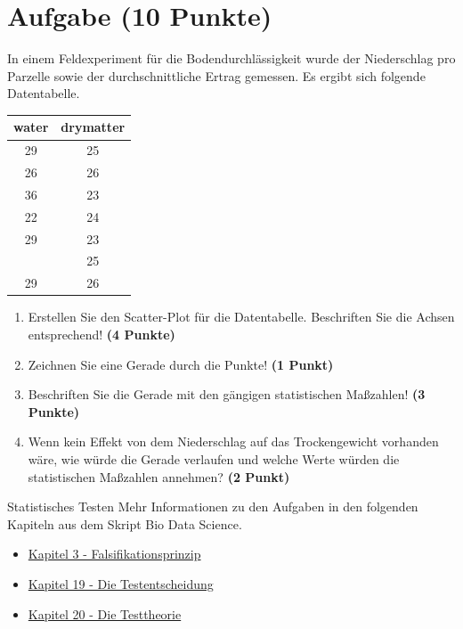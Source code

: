 \documentclass[a4paper, 10pt]{scrartcl}\usepackage[]{graphicx}\usepackage[]{xcolor}
\begin{document}
\section{Aufgabe \hfill (10 Punkte)}

In einem Feldexperiment f{\"u}r die Bodendurchl{\"a}ssigkeit wurde der Niederschlag
pro Parzelle sowie der durchschnittliche Ertrag gemessen. Es ergibt sich
folgende Datentabelle. 

\begin{table}[!h]
\centering
\begin{tabular}{cc}
\toprule
water & drymatter\\
\midrule
29 & 25\\
26 & 26\\
36 & 23\\
22 & 24\\
29 & 23\\
\addlinespace
24 & 25\\
29 & 26\\
\bottomrule
\end{tabular}
\end{table}



\begin{enumerate}
\item Erstellen Sie den Scatter-Plot f{\"u}r die Datentabelle. Beschriften Sie
  die Achsen entsprechend! \textbf{(4 Punkte)}
\item Zeichnen Sie eine Gerade durch die Punkte! \textbf{(1 Punkt)}
\item Beschriften Sie die Gerade mit den g{\"a}ngigen statistischen Ma{\ss}zahlen! \textbf{(3 Punkte)}
\item Wenn kein Effekt von dem Niederschlag auf das Trockengewicht
  vorhanden w{\"a}re, wie w{\"u}rde die Gerade verlaufen und welche Werte w{\"u}rden die
  statistischen Ma{\ss}zahlen annehmen? \textbf{(2 Punkt)}
\end{enumerate} 
\clearpage
\begin{graybox}{Statistisches Testen}
Mehr Informationen zu den Aufgaben in den folgenden Kapiteln aus dem Skript Bio Data Science.
  \begin{itemize}
  \item \href{https://jkruppa.github.io/preface.html#lernziel-3-falsifikationsprinzip}{Kapitel 3 - Falsifikationsprinzip}
  \item \href{https://jkruppa.github.io/stat-tests-basic.html}{Kapitel 19 - Die Testentscheidung}
  \item \href{https://jkruppa.github.io/stat-tests-theorie.html}{Kapitel 20 - Die Testtheorie}
  \end{itemize}
\end{graybox}
\end{document}
